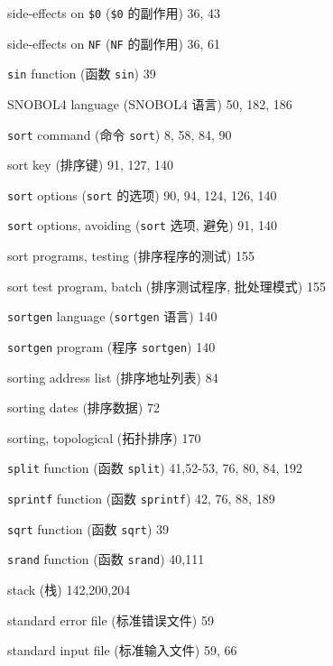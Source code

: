 \begin{multicols}{2}
\hangindent=2pc  side-effects on \verb'$0' (\verb'$0' 的副作用)
36, 43

\hangindent=2pc  side-effects on \verb'NF' (\verb'NF' 的副作用)
36, 61

\hangindent=2pc  \verb'sin' function (函数 \verb'sin') 39

\hangindent=2pc  SNOBOL4 language (SNOBOL4 语言) 50, 182, 186

\hangindent=2pc  \verb'sort' command (命令 \verb'sort')
8, 58, 84, 90

\hangindent=2pc  sort key (排序键) 91, 127, 140

\hangindent=2pc  \verb'sort' options (\verb'sort' 的选项)
90, 94, 124, 126, 140

\hangindent=2pc  \verb'sort' options, avoiding (\verb'sort'
选项, 避免) 91, 140

\hangindent=2pc  sort programs, testing (排序程序的测试) 155

\hangindent=2pc  sort test program, batch (排序测试程序,
批处理模式) 155

\hangindent=2pc  \verb'sortgen' language (\verb'sortgen' 语言) 140

\hangindent=2pc  \verb'sortgen' program (程序 \verb'sortgen') 140

\hangindent=2pc  sorting address list (排序地址列表) 84

\hangindent=2pc  sorting dates (排序数据) 72

\hangindent=2pc  sorting, topological (拓扑排序) 170

\hangindent=2pc  \verb'split' function (函数 \verb'split')
41,52-53, 76, 80, 84, 192

\hangindent=2pc  \verb'sprintf' function (函数 \verb'sprintf')
42, 76, 88, 189

\hangindent=2pc  \verb'sqrt' function (函数 \verb'sqrt') 39

\hangindent=2pc  \verb'srand' function (函数 \verb'srand') 40,111

\hangindent=2pc  stack (栈) 142,200,204

\hangindent=2pc  standard error file (标准错误文件) 59

\hangindent=2pc  standard input file (标准输入文件) 59, 66


\end{multicols}
